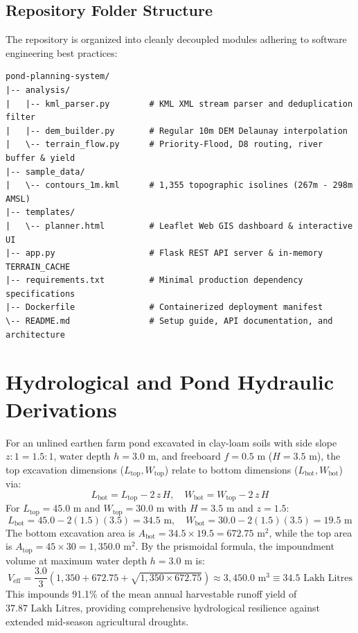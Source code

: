 \documentclass[manuscript,screen,review]{acmart}
\begin{document}
\subsection{Repository Folder Structure}
The repository is organized into cleanly decoupled modules adhering to software engineering best practices:
\begin{verbatim}
pond-planning-system/
|-- analysis/
|   |-- kml_parser.py        # KML XML stream parser and deduplication filter
|   |-- dem_builder.py       # Regular 10m DEM Delaunay interpolation
|   \-- terrain_flow.py      # Priority-Flood, D8 routing, river buffer & yield
|-- sample_data/
|   \-- contours_1m.kml      # 1,355 topographic isolines (267m - 298m AMSL)
|-- templates/
|   \-- planner.html         # Leaflet Web GIS dashboard & interactive UI
|-- app.py                   # Flask REST API server & in-memory TERRAIN_CACHE
|-- requirements.txt         # Minimal production dependency specifications
|-- Dockerfile               # Containerized deployment manifest
\-- README.md                # Setup guide, API documentation, and architecture
\end{verbatim}

\section{Hydrological and Pond Hydraulic Derivations}
\label{sec:hydrology-equations}
For an unlined earthen farm pond excavated in clay-loam soils with side slope $z:1 = 1.5:1$, water depth $h = 3.0\text{ m}$, and freeboard $f = 0.5\text{ m}$ ($H = 3.5\text{ m}$), the top excavation dimensions ($L_{\text{top}}, W_{\text{top}}$) relate to bottom dimensions ($L_{\text{bot}}, W_{\text{bot}}$) via:
\begin{equation}
    L_{\text{bot}} = L_{\text{top}} - 2\,z\,H, \quad W_{\text{bot}} = W_{\text{top}} - 2\,z\,H
\end{equation}
For $L_{\text{top}} = 45.0\text{ m}$ and $W_{\text{top}} = 30.0\text{ m}$ with $H = 3.5\text{ m}$ and $z = 1.5$:
\begin{equation}
    L_{\text{bot}} = 45.0 - 2(1.5)(3.5) = 34.5\text{ m}, \quad W_{\text{bot}} = 30.0 - 2(1.5)(3.5) = 19.5\text{ m}
\end{equation}
The bottom excavation area is $A_{\text{bot}} = 34.5 \times 19.5 = 672.75\text{ m}^2$, while the top area is $A_{\text{top}} = 45 \times 30 = 1,350.0\text{ m}^2$. By the prismoidal formula, the impoundment volume at maximum water depth $h = 3.0\text{ m}$ is:
\begin{equation}
    V_{\text{eff}} = \frac{3.0}{3} \left( 1,350 + 672.75 + \sqrt{1,350 \times 672.75} \right) \approx 3,450.0\text{ m}^3 \equiv 34.5\text{ Lakh Litres}
\end{equation}
This impounds 91.1\% of the mean annual harvestable runoff yield of $37.87\text{ Lakh Litres}$, providing comprehensive hydrological resilience against extended mid-season agricultural droughts.
\end{document}
